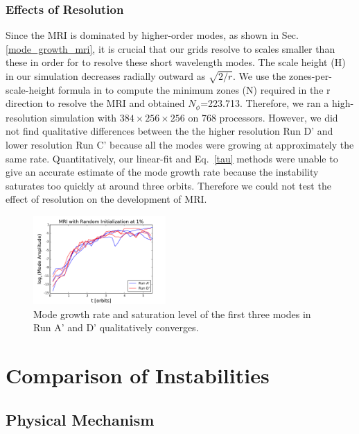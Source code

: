 \documentclass[iop,revtex4]{emulateapj}
\begin{document}
\subsubsection{Effects of Resolution}
\par Since the \ac{MRI} is dominated by higher-order modes, as shown in Sec.\ref{mode_growth_mri}, it is crucial that our grids resolve to scales smaller than these in order for to resolve these short wavelength modes. The scale height (H) in our simulation decreases radially outward as $\sqrt{2/r}$. We use the zones-per-scale-height formula in \cite{Hawley:2011A} to compute the minimum zones (N) required in the r direction to resolve the \ac{MRI} and obtained $N_\phi$=223.713. Therefore, we ran a high-resolution simulation with $384\times 256\times 256$ on 768 processors.  However, we did not find qualitative differences between the the higher resolution Run D' and lower resolution Run C' because all the modes were growing at approximately the same rate. Quantitatively, our linear-fit and Eq.~\ref{tau} methods were unable to give an accurate estimate of the mode growth rate because the instability saturates too quickly at around three orbits. Therefore we could not test the effect of resolution on the development of \ac{MRI}.
\begin{figure}[ht]
\includegraphics[width=0.45\textwidth]{plots/mri_randinit1percent.pdf}
\caption{Mode growth rate and saturation level of the first three modes in Run A' and D' qualitatively converges.}
\label{mri_mode_growth}
\end{figure}

\section{Comparison of Instabilities}
\subsection{Physical Mechanism}
\end{document}
